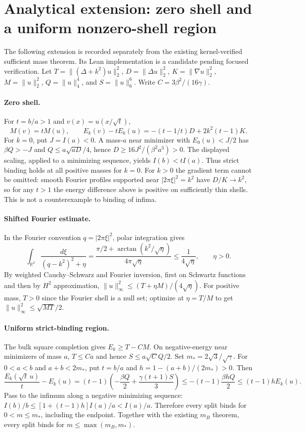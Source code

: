 \documentclass[11pt,letterpaper]{article}
\numberwithin{equation}{section}
\begin{document}
\section{Analytical extension: zero shell and a uniform nonzero-shell region}

The following extension is recorded separately from the existing kernel-verified
sufficient mass theorem. Its Lean implementation is a candidate pending focused
verification. Let $T=\|(\Delta+k^2)u\|_2^2$, $D=\|\Delta u\|_2^2$,
$K=\|\nabla u\|_2^2$, $M=\|u\|_2^2$, $Q=\|u\|_4^4$, and $S=\|u\|_6^6$.
Write $C=3\beta^2/(16\gamma)$.

\paragraph{Zero shell.}
For $t=b/a>1$ and $v(x)=u(x/\sqrt t)$,
\[
 M(v)=tM(u),\qquad E_k(v)-tE_k(u)=-(t-1/t)D+2k^2(t-1)K.
\]
For $k=0$, put $J=I(a)<0$. A mass-$a$ near minimizer with $E_0(u)<J/2$
has $\beta Q>-J$ and $Q\le a\sqrt{aD}/4$, hence
$D\ge16J^2/(\beta^2a^3)>0$. The displayed scaling, applied to a minimizing
sequence, yields $I(b)<t I(a)$. Thus strict binding holds at all positive
masses for $k=0$. For $k>0$ the gradient term cannot be omitted: smooth
Fourier profiles supported near $|2\pi\xi|^2=k^2$ have $D/K\to k^2$,
so for any $t>1$ the energy difference above is positive on sufficiently
thin shells. This is not a counterexample to binding of infima.

\paragraph{Shifted Fourier estimate.}
In the Fourier convention $q=|2\pi\xi|^2$, polar integration gives
\[
 \int_{\mathbb R^2}\frac{d\xi}{(q-k^2)^2+\eta}
 =\frac{\pi/2+\arctan(k^2/\sqrt\eta)}{4\pi\sqrt\eta}
 \le \frac{1}{4\sqrt\eta},\qquad \eta>0 .
\]
By weighted Cauchy--Schwarz and Fourier inversion, first on Schwartz
functions and then by $H^2$ approximation,
$\|u\|_\infty^2\le (T+\eta M)/(4\sqrt\eta)$.
For positive mass, $T>0$ since the Fourier shell is a null set; optimize
at $\eta=T/M$ to get $\|u\|_\infty^2\le\sqrt{MT}/2$.

\paragraph{Uniform strict-binding region.}
The bulk square completion gives $E_k\ge T-CM$. On negative-energy
near minimizers of mass $a$, $T\le Ca$ and hence $S\le a\sqrt C Q/2$.
Set $m_* = 2\sqrt{3}/\sqrt{\gamma}$. For $0<a<b$ and $a+b<2m_*$,
put $t=b/a$ and $h=1-(a+b)/(2m_*)>0$. Then
\[
 \frac{E_k(\sqrt t\,u)}t-E_k(u)
 =(t-1)\left(-\frac{\beta Q}{2}+\frac{\gamma(t+1)S}{3}\right)
 \le -(t-1)\frac{\beta hQ}{2}\le(t-1)h E_k(u).
\]
Pass to the infimum along a negative minimizing sequence:
$I(b)/b\le[1+(t-1)h] I(a)/a<I(a)/a$. Therefore every split binds for
$0<m\le m_*$, including the endpoint. Together with the existing
$m_B$ theorem, every split binds for $m\le\max(m_B,m_*)$.
\end{document}
